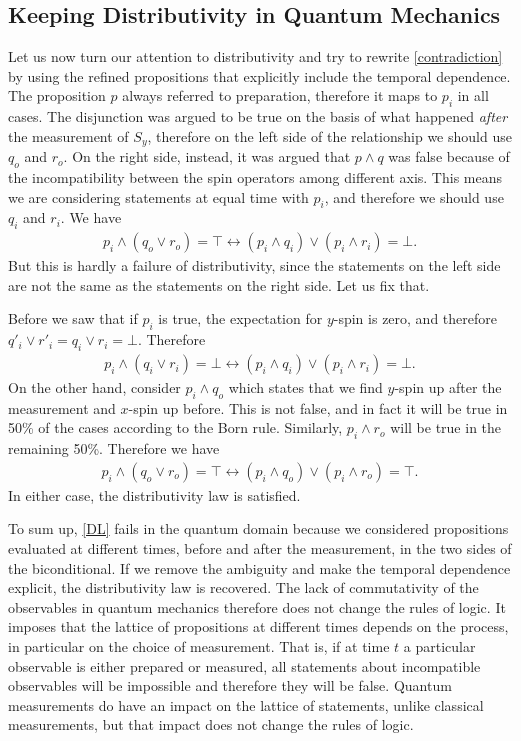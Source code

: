 \documentclass[11pt, executivepaper]{article}
\begin{document}
\subsection{Keeping Distributivity in Quantum Mechanics}

Let us now turn our attention to distributivity and try to rewrite \eqref{contradiction} by using the refined propositions that explicitly include the temporal dependence. The proposition $p$ always referred to preparation, therefore it maps to $p_i$ in all cases. The disjunction was argued to be true on the basis of what happened \emph{after} the measurement of $S_y$, therefore on the left side of the relationship we should use $q_o$ and $r_o$. On the right side, instead, it was argued that $p \wedge q$ was false because of the incompatibility between the spin operators among different axis. This means we are considering statements at equal time with $p_i$, and therefore we should use $q_i$ and $r_i$. We have 
\begin{align}
	\label{solved_contradiction}
	p_i \wedge (q_o \vee r_o) = \top \longleftrightarrow (p_i \wedge q_i) \vee (p_i\wedge r_i) = \bot.
\end{align}
\noindent But this is hardly a failure of distributivity, since the statements on the left side are not the same as the statements on the right side. Let us fix that.

Before we saw that if $p_i$ is true, the expectation for $y$-spin is zero, and therefore $q'_i \vee r'_i = q_i \vee r_i = \bot$. Therefore
\begin{align}
	\label{solved_distrib_1}
	p_i \wedge (q_i \vee r_i) = \bot \longleftrightarrow (p_i \wedge q_i) \vee (p_i\wedge r_i) = \bot.
\end{align}
\noindent On the other hand, consider $p_i \wedge q_o$ which states that we find $y$-spin up after the measurement and $x$-spin up before. This is not false, and in fact it will be true in 50\% of the cases according to the Born rule. Similarly, $p_i \wedge r_o$ will be true in the remaining 50\%. Therefore we have
\begin{align}
	\label{solved_distrib_2}
	p_i \wedge (q_o \vee r_o) = \top \longleftrightarrow (p_i \wedge q_o) \vee (p_i\wedge r_o) = \top.
\end{align}
\noindent In either case, the distributivity law is satisfied.

To sum up, \eqref{DL} fails in the quantum domain because we considered propositions evaluated at different times, before and after the measurement, in the two sides of the biconditional. If we remove the ambiguity and make the temporal dependence explicit, the distributivity law is recovered. The lack of commutativity of the observables in quantum mechanics therefore does not change the rules of logic. It imposes that the lattice of propositions at different times depends on the process, in particular on the choice of measurement. That is, if at time $t$ a particular observable is either prepared or measured, all statements about incompatible observables will be impossible and therefore they will be false. Quantum measurements do have an impact on the lattice of statements, unlike classical measurements, but that impact does not change the rules of logic.
\end{document}
